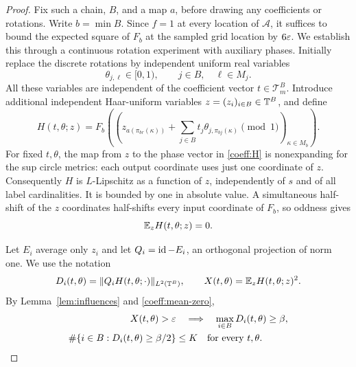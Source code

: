 \begin{proof}
Fix such a chain, $B$, and a map $a$, before drawing any coefficients or
rotations.  Write $b=\min B$.
Since $f=1$ at every location of $\mathcal A$, it suffices to bound the
expected square of $F_b$ at the sampled grid location by $6\varepsilon$.
We establish this through a continuous rotation experiment with auxiliary
phases.  Initially replace the discrete rotations
by independent uniform real variables
\[
 \theta_{j,\ell}\in[0,1),
 \qquad j\in B,\quad \ell\in M_j.
\]
All these variables are independent of the coefficient vector
$t\in\mathcal T_m^B$.  Introduce additional independent Haar-uniform
variables $z=(z_i)_{i\in B}\in\mathbb T^B$, and define
\begin{equation}\label{coeff:H}
 H(t,\theta;z)
 =F_b\left(\left(
 z_{a(\pi_{br}(\kappa))}
 +\sum_{j\in B}t_j\theta_{j,\pi_{bj}(\kappa)}
 \pmod 1\right)_{\kappa\in M_b}\right).
\end{equation}
For fixed $t,\theta$, the map from $z$ to the phase vector in
\eqref{coeff:H} is nonexpanding for the sup circle metrics: each output
coordinate uses just one coordinate of $z$.  Consequently $H$ is
$L$-Lipschitz as a function of $z$, independently of $s$ and of all label
cardinalities.  It is bounded by one in absolute value.  A simultaneous
half-shift of the $z$ coordinates half-shifts every input coordinate of
$F_b$, so oddness gives
\begin{equation}\label{coeff:mean-zero}
 \mathbb E_z H(t,\theta;z)=0.
\end{equation}

Let $E_i$ average only $z_i$ and let $Q_i=\operatorname{id}-E_i$, an orthogonal
projection of norm one.  We use the notation
\[
 D_i(t,\theta)=\|Q_iH(t,\theta;\cdot)\|_{L^2(\mathbb T^B)},
 \qquad X(t,\theta)=\mathbb E_z H(t,\theta;z)^2.
\]
By Lemma~\ref{lem:influences} and \eqref{coeff:mean-zero},
\begin{align}
 X(t,\theta)>\varepsilon
 &\quad\Longrightarrow\quad
 \max_{i\in B}D_i(t,\theta)\ge\beta,
 \label{coeff:variance-detection}\\
 \#\{i\in B:D_i(t,\theta)\ge\beta/2\}
 &\le K
 \quad\text{for every }t,\theta.
 \label{coeff:count}
\end{align}


\end{proof}
